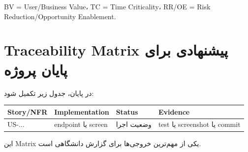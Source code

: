 BV = User/Business Value، TC = Time Criticality، RR/OE = Risk Reduction/Opportunity Enablement.

\section{Traceability Matrix پیشنهادی برای پایان پروژه}

در پایان، جدول زیر تکمیل شود:

\begin{longtable}{p{2.2cm}p{4.3cm}p{2.3cm}p{4cm}}
\toprule
Story/NFR & Implementation & Status & Evidence \\
\midrule
US-... & endpoint یا screen & وضعیت اجرا & test یا screenshot یا commit \\
\bottomrule
\end{longtable}

این Matrix یکی از مهم‌ترین خروجی‌ها برای گزارش دانشگاهی است.
